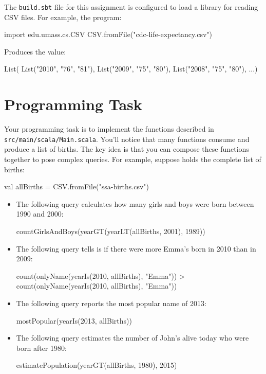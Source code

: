 \documentclass{book}
\begin{document}
The \texttt{build.sbt} file for this assignment is
configured to load a library for reading CSV files. For example, the program:
\begin{scalacode}
import edu.umass.cs.CSV
CSV.fromFile("cdc-life-expectancy.csv")
\end{scalacode}
Produces the value:
\begin{scalacode}
List(
  List("2010", "76", "81"),
  List("2009", "75", "80"),
  List("2008", "75", "80"),
  ...)
\end{scalacode}

\section{Programming Task}

Your programming task is to implement the functions described
in \texttt{src/main/scala/Main.scala}. You'll notice that many functions
consume and produce a list of births. The key idea is that you can
compose these functions together to pose complex queries. For example,
suppose  holds the complete list of births:

\begin{scalacode}
val allBirths = CSV.fromFile("ssa-births.csv")
\end{scalacode}

\begin{itemize}

  \item The following query calculates how many girls and boys were born between 1990
  and 2000:

  \begin{scalacode}
  countGirlsAndBoys(yearGT(yearLT(allBirths, 2001), 1989))
  \end{scalacode}

  \item The following query tells is if there were more Emma's born in 2010 than
  in 2009:

  \begin{scalacode}
  count(onlyName(yearIs(2010, allBirths), "Emma")) > count(onlyName(yearIs(2010, allBirths), "Emma"))
  \end{scalacode}

  \item The following query reports the most popular name of 2013:

  \begin{scalacode}
  mostPopular(yearIs(2013, allBirths))
  \end{scalacode}

  \item The following query estimates the number of John's alive today who
  were born after 1980:

  \begin{scalacode}
  estimatePopulation(yearGT(allBirths, 1980), 2015)
  \end{scalacode}

\end{itemize}
\end{document}
